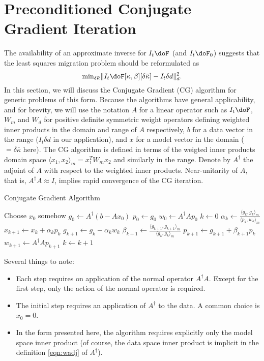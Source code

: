 \section{Preconditioned Conjugate Gradient Iteration}
The availability of an approximate inverse for $I_t \doF$ (and $I_t
\doF_0$) suggests that the least squares migration problem should be
reformulated as
\begin{equation}
\label{eqn:elsm}
\mbox{min}_{\delta \bar{\kappa}} \|I_t\doF[\kappa,\beta][\delta 
\bar{\kappa}] -I_t\delta d\|^2_d. 
\end{equation}
In this section, we will discuss the Conjugate Gradient (CG) algorithm
for generic problems of this form. Because the algorithms have general
applicability, and for brevity, we will use the notation $A$ for a
linear operator such as $I_t \doF$, $W_m$ and $W_d$ for positive
definite symmetric weight operators defining weighted inner products
in the domain and range of $A$ respectively, $b$ for a data vector in
the range ($I_t \delta d$ in our application), and $x$ for a model
vector in the domain ($=\delta \bar{\kappa}$ here). 
The CG algorithm is defined in terms of the weigted inner products
domain space $\langle x_1, x_2 \rangle_m = x_1^TW_m x_2$ and similarly
in the range. Denote by $A^{\dagger}$ the adjoint of $A$ with respect to the
weighted inner products.
Near-unitarity of $A$, that is, $A^{\dagger}A \approx I$, implies
rapid convergence of the CG iteration. 
\begin{algorithm}[H]
\caption{Conjugate Gradient Algorithm}
\begin{algorithmic}[1]
  \State Choose $x_0$ somehow
  \State $g_0 \gets A^{\dagger}(b-Ax_0)$
  \State $p_0 \gets g_0$ 
  \State $w_0 \gets A^{\dagger}A p_0$
  \State $k \gets 0$
  \Repeat
  \State $\alpha_k \gets \frac{\langle g_k,g_k \rangle_m}{\langle p_k,w_k\rangle_m}$
  \State $x_{k+1} \gets x_k + \alpha_k p_k$
\State $g_{k+1} \gets g_k - \alpha_kw_k$
  \State $\beta_{k+1} \gets \frac{\langle g_{k+1},g_{k+1}\rangle_m}{\langle g_k,g_k\rangle_m}$
  \State $p_{k+1}\gets g_{k+1}+\beta_{k+1}p_k$
  \State $w_{k+1} \gets A^{\dagger}Ap_{k+1}$
  \State $k \gets k+1$
\end{algorithmic}
\end{algorithm}
Several things to note:
\begin{itemize}
\item Each step requires on application of the normal operator $A^{\dagger}A$. Except for the first step, only the action of the normal  operator is required.
\item The initial step requires an application of $A^{\dagger}$ to the
  data. A common choice is $x_0 = 0$.
\item In the form presented here, the algorithm requires explicitly only the model space inner product (of course, the data space inner
  product is implicit in the definition \ref{eqn:wadj} of
  $A^{\dagger}$). 
\end{itemize}

